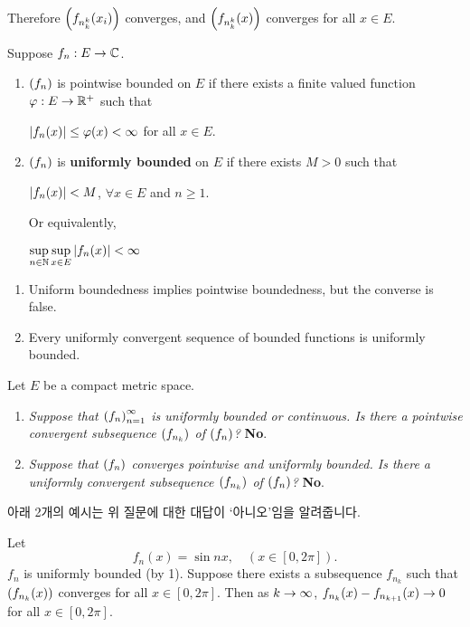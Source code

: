 Therefore \(\left( f_{n_k^k}(x_i) \right)\) converges, and \(\left( f_{n_k^k}(x) \right)\) converges for all \(x \in E\).

 Suppose \(f_n: E \rightarrow \mathbb{C}\).
\begin{enumerate}
    \item \(\left( f_n \right)\) is pointwise bounded on \(E\) if there exists a finite valued function \(\varphi: E \rightarrow \mathbb{R}^+\) such that
          \begin{center}
              \(\left| f_n(x) \right| \leq \varphi(x) < \infty\) for all \(x\in E\).
          \end{center}
    \item \(\left( f_n \right)\) is \textbf{uniformly bounded} on \(E\) if there exists \(M > 0\) such that
          \begin{center}
              \(\left| f_n(x) \right| < M\), \(\forall x \in E\) and \(n \geq 1\).
          \end{center}
          Or equivalently,
          \begin{center}
              \(\displaystyle \sup_{n\in \mathbb{N}} \sup_{x \in E} \left| f_n(x) \right| < \infty\)
          \end{center}
\end{enumerate}

\rmk
\begin{enumerate}
    \item Uniform boundedness implies pointwise boundedness, but the converse is false.
    \item Every uniformly convergent sequence of bounded functions is uniformly bounded.
\end{enumerate}

\medskip

\question Let \(E\) be a compact metric space.
\begin{enumerate}
    \item \textit{Suppose that \(\left( f_n \right)_{n=1}^\infty\) is uniformly bounded or continuous. Is there a pointwise convergent subsequence \(\left( f_{n_k} \right)\) of \(\left( f_n \right)\)?} \textbf{No}.
    \item \textit{Suppose that \(\left( f_n \right)\) converges pointwise and uniformly bounded. Is there a uniformly convergent subsequence \(\left( f_{n_k} \right)\) of \(\left( f_n \right)\)?} \textbf{No}.
\end{enumerate}

아래 2개의 예시는 위 질문에 대한 대답이 `아니오'임을 알려줍니다.

 Let
\[
    f_n(x) = \sin nx, \quad (x \in [0, 2\pi]).
\]
\(f_n\) is uniformly bounded (by 1). Suppose there exists a subsequence \(f_{n_k}\) such that \(\left( f_{n_k}(x) \right)\) converges for all \(x \in [0, 2\pi]\). Then as \(k\rightarrow\infty\), \(f_{n_k}(x) - f_{n_{k+1}}(x) \rightarrow 0\) for all \(x \in [0, 2\pi]\).

